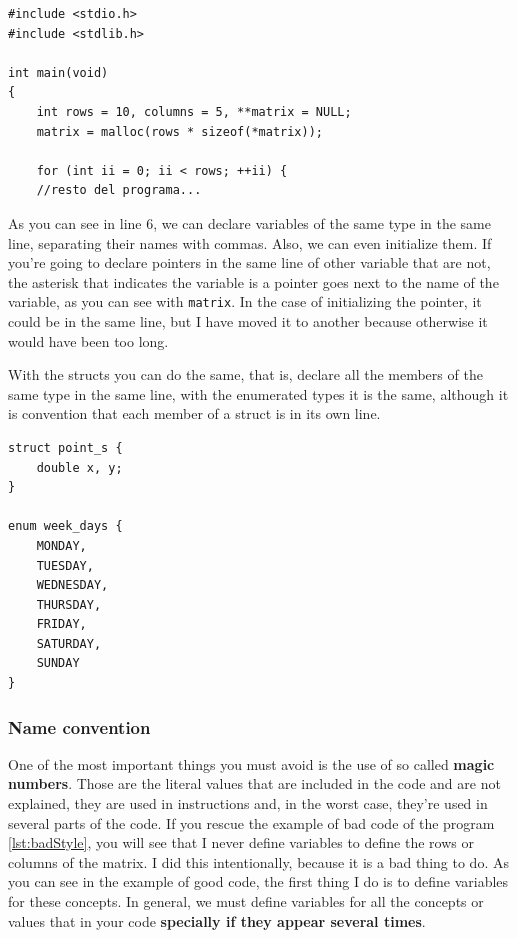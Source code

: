\documentclass[a4paper]{article}
\begin{document}
\noindent
\begin{minipage}[H]{\linewidth}
\mbox{}
\begin{lstlisting}[style=C,
caption={Declaration of variable in the same line},
label={lst:singleLineDeclaration}]
#include <stdio.h>
#include <stdlib.h>

int main(void)
{
    int rows = 10, columns = 5, **matrix = NULL;
    matrix = malloc(rows * sizeof(*matrix));

    for (int ii = 0; ii < rows; ++ii) {
    //resto del programa...
\end{lstlisting}
\end{minipage}

As you can see in line 6, we can declare variables of the same type in the same
line, separating their names with commas. Also, we can even initialize them.
If you're going to declare pointers in the same line of other variable that are
not, the asterisk that indicates the variable is a pointer goes next to the name
of the variable, as you can see with \verb!matrix!. In the case of initializing
the pointer, it could be in the same line, but I have moved it to another
because otherwise it would have been too long.

With the structs you can do the same, that is, declare all the members of the
same type in the same line, with the enumerated types it is the same, although
it is convention that each member of a struct is in its own line.

\noindent
\begin{minipage}[H]{\linewidth}
\mbox{}
\begin{lstlisting}[style=C,
caption={Declaration of member of a \textit{struct} in a single line},
label={lst:singleLineDeclarationStruct}]
struct point_s {
    double x, y;
}

enum week_days {
    MONDAY,
    TUESDAY,
    WEDNESDAY,
    THURSDAY,
    FRIDAY,
    SATURDAY,
    SUNDAY
}
\end{lstlisting}
\end{minipage}

\subsubsection{Name convention}
One of the most important things you must avoid is the use of so called
\textbf{magic numbers}. Those are the literal values that are included in the
code and are not explained, they are used in instructions and, in the worst
case, they're used in several parts of the code. If you rescue the example of
bad code of the program \ref{lst:badStyle}, you will see that I never define
variables to define the rows or columns of the matrix. I did this intentionally,
because it is a bad thing to do. As you can see in the example of good code,
the first thing I do is to define variables for these concepts. In general, we
must define variables for all the concepts or values that in your code
\textbf{specially if they appear several times}.
\end{document}
